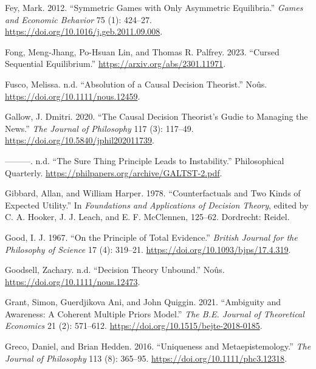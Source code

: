 \documentclass[
  12pt,
  letterpaper,
  DIV=11,
  numbers=noendperiod]{scrreprt}
\newlength{\cslhangindent}
\newlength{\cslentryspacingunit} %
\newenvironment{CSLReferences}[2] %
 {%
  \setlength{\parindent}{0pt}
  \ifodd #1
  \let\oldpar\par
  \def\par{\hangindent=\cslhangindent\oldpar}
  \fi
  \setlength{\parskip}{#2\cslentryspacingunit}
 }%
 {}
\begin{document}
\begin{CSLReferences}{1}{0}
\leavevmode{}%
Fey, Mark. 2012. {``Symmetric Games with Only Asymmetric Equilibria.''}
\emph{Games and Economic Behavior} 75 (1): 424--27.
\url{https://doi.org/10.1016/j.geb.2011.09.008}.

\leavevmode{}%
Fong, Meng-Jhang, Po-Hsuan Lin, and Thomas R. Palfrey. 2023. {``Cursed
Sequential Equilibrium.''} \url{https://arxiv.org/abs/2301.11971}.

\leavevmode{}%
Fusco, Melissa. n.d. {``Absolution of a Causal Decision Theorist.''}
No{û}s. \url{https://doi.org/10.1111/nous.12459}.

\leavevmode{}%
Gallow, J. Dmitri. 2020. {``The Causal Decision Theorist's Gudie to
Managing the News.''} \emph{The Journal of Philosophy} 117 (3): 117--49.
\url{https://doi.org/10.5840/jphil202011739}.

\leavevmode{}%
---------. n.d. {``The Sure Thing Principle Leads to Instability.''}
Philosophical Quarterly.
\url{https://philpapers.org/archive/GALTST-2.pdf}.

\leavevmode{}%
Gibbard, Allan, and William Harper. 1978. {``Counterfactuals and Two
Kinds of Expected Utility.''} In \emph{Foundations and Applications of
Decision Theory}, edited by C. A. Hooker, J. J. Leach, and E. F.
McClennen, 125--62. Dordrecht: Reidel.

\leavevmode{}%
Good, I. J. 1967. {``On the Principle of Total Evidence.''}
\emph{British Journal for the Philosophy of Science} 17 (4): 319--21.
\url{https://doi.org/10.1093/bjps/17.4.319}.

\leavevmode{}%
Goodsell, Zachary. n.d. {``Decision Theory Unbound.''} No{û}s.
\url{https://doi.org/10.1111/nous.12473}.

\leavevmode{}%
Grant, Simon, Guerdjikova Ani, and John Quiggin. 2021. {``Ambiguity and
Awareness: A Coherent Multiple Priors Model.''} \emph{The B.E. Journal
of Theoretical Economics} 21 (2): 571--612.
\url{https://doi.org/10.1515/bejte-2018-0185}.

\leavevmode{}%
Greco, Daniel, and Brian Hedden. 2016. {``Uniqueness and
Metaepistemology.''} \emph{The Journal of Philosophy} 113 (8): 365--95.
\url{https://doi.org/10.1111/phc3.12318}.


\end{CSLReferences}
\end{document}
